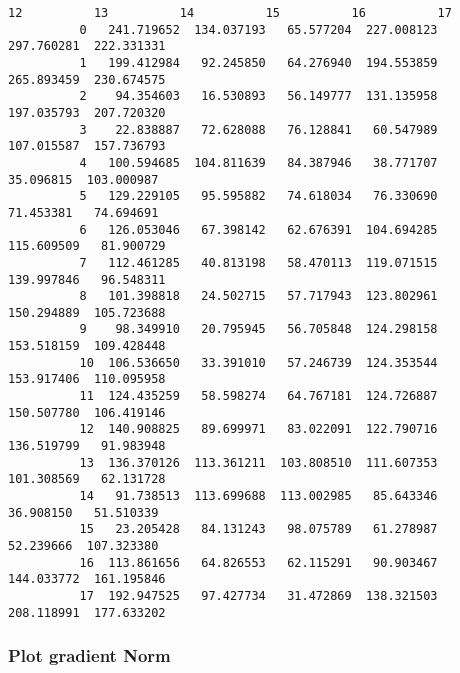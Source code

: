 \documentclass[11pt]{article}
\begin{document}
\begin{Verbatim}[commandchars=\\\{\}]
                      12          13          14          15          16          17  
          0   241.719652  134.037193   65.577204  227.008123  297.760281  222.331331  
          1   199.412984   92.245850   64.276940  194.553859  265.893459  230.674575  
          2    94.354603   16.530893   56.149777  131.135958  197.035793  207.720320  
          3    22.838887   72.628088   76.128841   60.547989  107.015587  157.736793  
          4   100.594685  104.811639   84.387946   38.771707   35.096815  103.000987  
          5   129.229105   95.595882   74.618034   76.330690   71.453381   74.694691  
          6   126.053046   67.398142   62.676391  104.694285  115.609509   81.900729  
          7   112.461285   40.813198   58.470113  119.071515  139.997846   96.548311  
          8   101.398818   24.502715   57.717943  123.802961  150.294889  105.723688  
          9    98.349910   20.795945   56.705848  124.298158  153.518159  109.428448  
          10  106.536650   33.391010   57.246739  124.353544  153.917406  110.095958  
          11  124.435259   58.598274   64.767181  124.726887  150.507780  106.419146  
          12  140.908825   89.699971   83.022091  122.790716  136.519799   91.983948  
          13  136.370126  113.361211  103.808510  111.607353  101.308569   62.131728  
          14   91.738513  113.699688  113.002985   85.643346   36.908150   51.510339  
          15   23.205428   84.131243   98.075789   61.278987   52.239666  107.323380  
          16  113.861656   64.826553   62.115291   90.903467  144.033772  161.195846  
          17  192.947525   97.427734   31.472869  138.321503  208.118991  177.633202  
\end{Verbatim}
            
    \subsubsection{Plot gradient Norm}\label{plot-gradient-norm}
\end{document}
